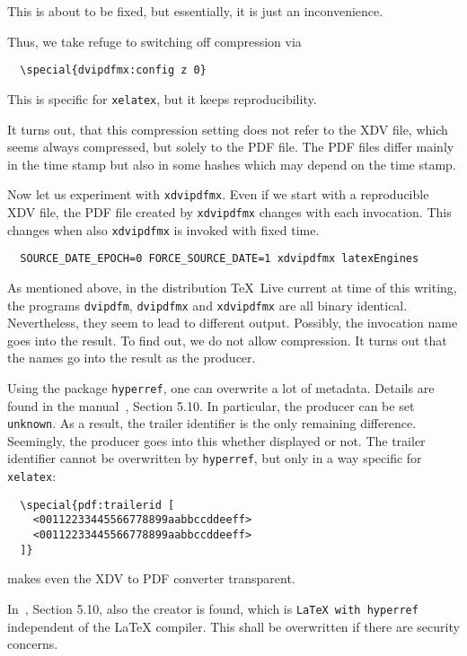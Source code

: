 \documentclass[a4paper, english]{article}%
\newcommand{\xelatex}{\texttt{xelatex}}
\newcommand{\texlive}{\TeX~Live}
\begin{document}
This is about to be fixed, 
but essentially, it is just an inconvenience. 

Thus, we take refuge to switching off compression via 
%
\begin{verbatim}
  \special{dvipdfmx:config z 0}
\end{verbatim}
%
This is specific for \xelatex, but it keeps reproducibility. 

It turns out, that this compression setting does not refer to the XDV file, 
which seems always compressed, but solely to the PDF file. 
The PDF files differ mainly in the time stamp 
but also in some hashes which may depend on the time stamp. 

Now let us experiment with \texttt{xdvipdfmx}. 
Even if we start with a reproducible XDV file, 
the PDF file created by \texttt{xdvipdfmx} 
changes with each invocation. 
This changes when also \texttt{xdvipdfmx} is invoked with fixed time. 
%
\begin{verbatim}
  SOURCE_DATE_EPOCH=0 FORCE_SOURCE_DATE=1 xdvipdfmx latexEngines
\end{verbatim}

As mentioned above, in the distribution \texlive{} current at time of this writing, 
the programs \texttt{dvipdfm}, \texttt{dvipdfmx} and \texttt{xdvipdfmx} 
are all binary identical. 
Nevertheless, they seem to lead to different output. 
Possibly, the invocation name goes into the result. 
To find out, we do not allow compression. 
It turns out that the names go into the result as the producer. 

Using the package \texttt{hyperref}, 
one can overwrite a lot of metadata. 
Details are found in the manual~\cite{HyperTextP}, Section 5.10. 
In particular, the producer can be set \texttt{unknown}. 
As a result, the trailer identifier is the only remaining difference. 
Seemingly, the producer goes into this whether displayed or not. 
The trailer identifier cannot be overwritten by \texttt{hyperref}, 
but only in a way specific for \xelatex: 
%
\begin{verbatim}
  \special{pdf:trailerid [
    <00112233445566778899aabbccddeeff>
    <00112233445566778899aabbccddeeff>
  ]}  
\end{verbatim}
%
makes even the XDV to PDF converter transparent. 

In~\cite{HyperTextP}, Section 5.10, also the creator is found, 
which is \texttt{LaTeX with hyperref} independent of the \LaTeX{} compiler. 
This shall be overwritten if there are security concerns. 
\end{document}
